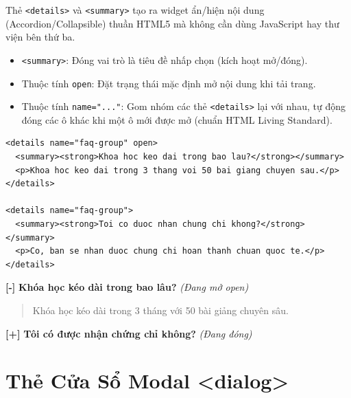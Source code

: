 \documentclass[11pt,oneside]{book}
\newcommand{\codeinline}[1]{\textcolor{accentOrange}{\texttt{#1}}}
\begin{document}
\begin{conceptBox}
Thẻ \codeinline{<details>} và \codeinline{<summary>} tạo ra widget ẩn/hiện nội dung (Accordion/Collapsible) thuần HTML5 mà không cần dùng JavaScript hay thư viện bên thứ ba.
\begin{itemize}[leftmargin=1.5em, itemsep=2pt, parsep=0pt]
    \item \codeinline{<summary>}: Đóng vai trò là tiêu đề nhấp chọn (kích hoạt mở/đóng).
    \item Thuộc tính \codeinline{open}: Đặt trạng thái mặc định mở nội dung khi tải trang.
    \item Thuộc tính \codeinline{name="..."}: Gom nhóm các thẻ \codeinline{<details>} lại với nhau, tự động đóng các ô khác khi một ô mới được mở (chuẩn HTML Living Standard).
\end{itemize}
\end{conceptBox}

\begin{codeWindow}
\begin{lstlisting}[language=HTML5]
<details name="faq-group" open>
  <summary><strong>Khoa hoc keo dai trong bao lau?</strong></summary>
  <p>Khoa hoc keo dai trong 3 thang voi 50 bai giang chuyen sau.</p>
</details>

<details name="faq-group">
  <summary><strong>Toi co duoc nhan chung chi khong?</strong></summary>
  <p>Co, ban se nhan duoc chung chi hoan thanh chuan quoc te.</p>
</details>
\end{lstlisting}
\end{codeWindow}

\begin{browserWindow}
\sffamily\small
\textbf{[-]} \textbf{Khóa học kéo dài trong bao lâu?} \quad \textcolor{codeComment}{\small\textit{(Đang mở open)}} \\
\begin{quote}\small
Khóa học kéo dài trong 3 tháng với 50 bài giảng chuyên sâu.
\end{quote}
\textbf{[+]} \textbf{Tôi có được nhận chứng chỉ không?} \quad \textcolor{codeComment}{\small\textit{(Đang đóng)}}
\end{browserWindow}

\section{Thẻ Cửa Sổ Modal <dialog>}
\label{sec:dialog_modal}
\end{document}
